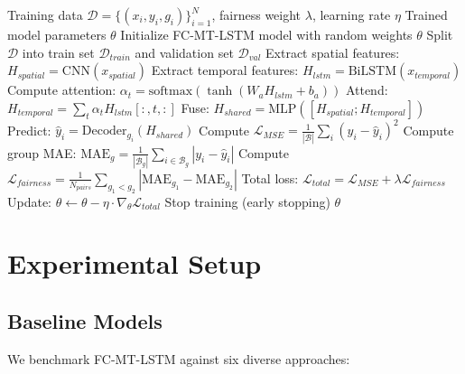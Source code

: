 \documentclass[conference]{IEEEtran}
\newcommand{\modelname}{FC-MT-LSTM}
\begin{document}
\begin{algorithm}[t]
\caption{FC-MT-LSTM Training with Fairness Constraints}
\label{alg:fc_mt_lstm}
\begin{algorithmic}[1]
\REQUIRE Training data $\mathcal{D} = \{(x_i, y_i, g_i)\}_{i=1}^N$, fairness weight $\lambda$, learning rate $\eta$
\ENSURE Trained model parameters $\theta$
\STATE Initialize FC-MT-LSTM model with random weights $\theta$
\STATE Split $\mathcal{D}$ into train set $\mathcal{D}_{train}$ and validation set $\mathcal{D}_{val}$
        \STATE Extract spatial features: $H_{spatial} = \text{CNN}(x_{spatial})$
        \STATE Extract temporal features: $H_{lstm} = \text{BiLSTM}(x_{temporal})$
        \STATE Compute attention: $\alpha_t = \text{softmax}(\tanh(W_a H_{lstm} + b_a))$
        \STATE Attend: $H_{temporal} = \sum_t \alpha_t H_{lstm}[:, t, :]$
        \STATE Fuse: $H_{shared} = \text{MLP}([H_{spatial}; H_{temporal}])$
        \STATE Predict: $\hat{y}_i = \text{Decoder}_{g_i}(H_{shared})$
        \STATE Compute $\mathcal{L}_{MSE} = \frac{1}{|\mathcal{B}|}\sum_{i}(y_i - \hat{y}_i)^2$
        \STATE Compute group MAE: $\text{MAE}_g = \frac{1}{|\mathcal{B}_g|}\sum_{i \in \mathcal{B}_g}|y_i - \hat{y}_i|$
        \STATE Compute $\mathcal{L}_{fairness} = \frac{1}{N_{pairs}}\sum_{g_1 < g_2}|\text{MAE}_{g_1} - \text{MAE}_{g_2}|$
        \STATE Total loss: $\mathcal{L}_{total} = \mathcal{L}_{MSE} + \lambda \mathcal{L}_{fairness}$
        \STATE Update: $\theta \leftarrow \theta - \eta \cdot \nabla_\theta \mathcal{L}_{total}$
    \ENDFOR
        \STATE Stop training (early stopping)
    \ENDIF
\ENDFOR
\RETURN $\theta$
\end{algorithmic}
\end{algorithm}

\section{Experimental Setup}

\subsection{Baseline Models}

We benchmark \modelname{} against six diverse approaches:
\end{document}

